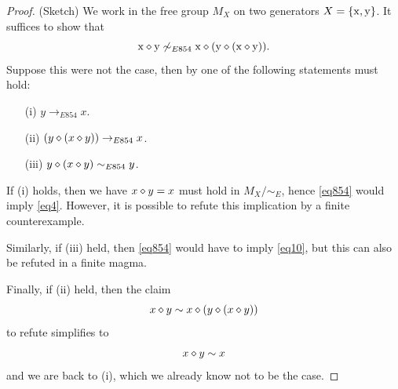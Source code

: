 \begin{proof}(Sketch)
  We work in the free group $M_X$ on two generators $X = \{\mathrm{x},\mathrm{y}\}$.  It suffices to show that
$$  \mathrm{x} \diamond \mathrm{y} \not \sim_{E854} \mathrm{x} \diamond (\mathrm{y} \diamond (\mathrm{x} \diamond \mathrm{y})).$$
Suppose this were not the case, then by  one of the following statements must hold:
\begin{itemize}
\item[(i)] $y \to_{E854} x$.
\item[(ii)] $(y \diamond (x \diamond y)) \to_{E854} x$.
\item[(iii)] $y \diamond (x \diamond y) \sim_{E854} y$.
\end{itemize}
If (i) holds, then we have $x \diamond y = x$ must hold in $M_X/\sim_E$, hence \eqref{eq854} would imply \eqref{eq4}.  However, it is possible to refute this implication by a finite counterexample.

Similarly, if (iii) held, then \eqref{eq854} would have to imply \eqref{eq10}, but this can also be refuted in a finite magma.

Finally, if (ii) held, then the claim
$$  x \diamond y \sim x \diamond (y \diamond (x \diamond y))$$
to refute simplifies to
$$  x \diamond y \sim x$$
and we are back to (i), which we already know not to be the case.
\end{proof}
